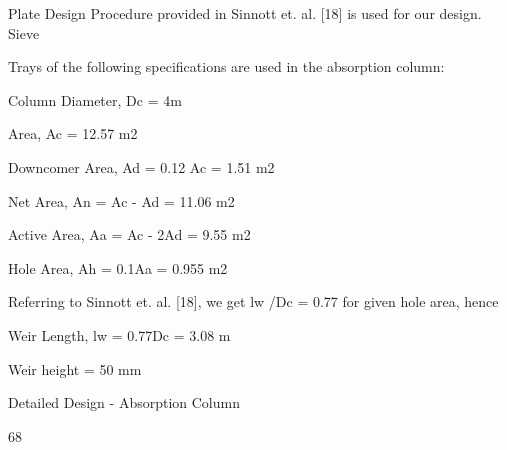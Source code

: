 \documentclass[a4paper,portrait,12pt]{article}
\begin{document}
\begin{flushleft}
Plate Design Procedure provided in Sinnott et. al. [18] is used for our design. Sieve
\end{flushleft}


\begin{flushleft}
Trays of the following specifications are used in the absorption column:
\end{flushleft}


\begin{flushleft}
Column Diameter, Dc = 4m
\end{flushleft}


\begin{flushleft}
Area, Ac = 12.57 m2
\end{flushleft}


\begin{flushleft}
Downcomer Area, Ad = 0.12 Ac = 1.51 m2
\end{flushleft}


\begin{flushleft}
Net Area, An = Ac - Ad = 11.06 m2
\end{flushleft}


\begin{flushleft}
Active Area, Aa = Ac - 2Ad = 9.55 m2
\end{flushleft}


\begin{flushleft}
Hole Area, Ah = 0.1Aa = 0.955 m2
\end{flushleft}


\begin{flushleft}
Referring to Sinnott et. al. [18], we get lw /Dc = 0.77 for given hole area, hence
\end{flushleft}


\begin{flushleft}
Weir Length, lw = 0.77Dc = 3.08 m
\end{flushleft}


\begin{flushleft}
Weir height = 50 mm
\end{flushleft}





\begin{flushleft}
\newpage
Detailed Design - Absorption Column
\end{flushleft}





68
\end{document}
